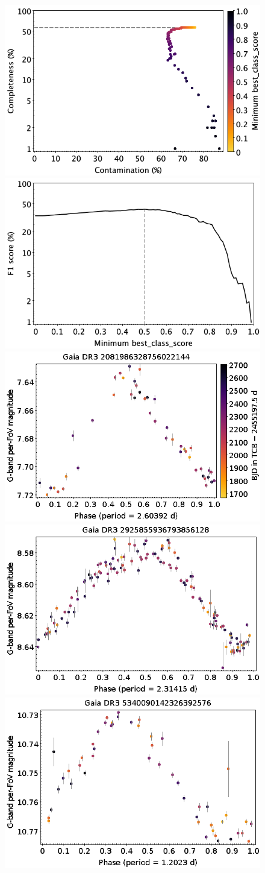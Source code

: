 \documentclass[longauth]{aa}
\begin{document}
\begin{appendix}
\begin{figure}
\centering
{} \includegraphics[width=0.45\hsize]{figures/appendix/SPB_cls_scc.png}  
\hspace{2mm}
 \includegraphics[width=0.45\hsize]{figures/appendix/SPB_cls_sf1.png} \\ 
\vspace{4mm}
 \includegraphics[width=0.45\hsize]{figures/appendix/SPB-8.png}  
\hspace{2mm}
 \includegraphics[width=0.45\hsize]{figures/appendix/SPB-16.png} \\
\vspace{4mm}
 \includegraphics[width=0.45\hsize]{figures/appendix/SPB-55.png}  

\end{figure}
\end{appendix}
\end{document}
